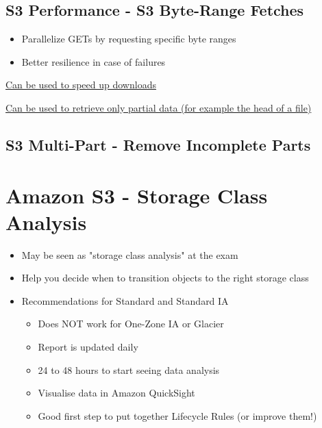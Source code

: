 \subsection{S3 Performance - S3 Byte-Range Fetches}
\begin{itemize}
    \item Parallelize GETs by requesting specific byte ranges
    \item Better resilience in case of failures
\end{itemize}
\underline{Can be used to speed up downloads}

\underline{Can be used to retrieve only partial data (for example the head of a file)}

\subsection{S3 Multi-Part - Remove Incomplete Parts}


\section{Amazon S3 - Storage Class Analysis}
\begin{itemize}
    \item May be seen as "storage class analysis" at the exam
    \item Help you decide when to transition objects to the right storage class
    \item Recommendations for Standard and Standard IA
    \begin{itemize}
        \item Does NOT work for One-Zone IA or Glacier
    \end{itemize}
    \begin{itemize}
        \item Report is updated daily
        \item 24 to 48 hours to start seeing data analysis
        \item Visualise data in Amazon QuickSight
        \item Good first step to put together Lifecycle Rules (or improve them!)
    \end{itemize}
\end{itemize}


